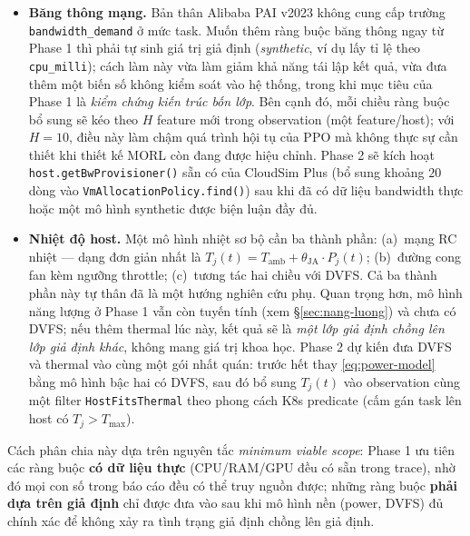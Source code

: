\begin{itemize}
  \item \textbf{Băng thông mạng.} Bản thân Alibaba PAI v2023 không cung
        cấp trường \texttt{bandwidth\_demand} ở mức task. Muốn thêm ràng
        buộc băng thông ngay từ Phase 1 thì phải tự sinh giá trị giả
        định (\textit{synthetic}, ví dụ lấy tỉ lệ theo
        \texttt{cpu\_milli}); cách làm này vừa làm giảm khả năng tái lập
        kết quả, vừa đưa thêm một biến số không kiểm soát vào hệ thống,
        trong khi mục tiêu của Phase 1 là \emph{kiểm chứng kiến trúc
        bốn lớp}. Bên cạnh đó, mỗi chiều ràng buộc bổ sung sẽ kéo theo
        $H$ feature mới trong observation (một feature/host); với $H =
        10$, điều này làm chậm quá trình hội tụ của PPO mà không thực
        sự cần thiết khi thiết kế MORL còn đang được hiệu chỉnh. Phase
        2 sẽ kích hoạt \texttt{host.getBwProvisioner()} sẵn có của
        CloudSim Plus (bổ sung khoảng $20$ dòng vào
        \texttt{VmAllocationPolicy.find()}) sau khi đã có dữ liệu
        bandwidth thực hoặc một mô hình synthetic được biện luận đầy đủ.
  \item \textbf{Nhiệt độ host.} Một mô hình nhiệt sơ bộ cần ba thành
        phần: (a)~mạng RC nhiệt --- dạng đơn giản nhất là
        $T_j(t) = T_{\mathrm{amb}} + \theta_{\mathrm{JA}} \cdot P_j(t)$;
        (b)~đường cong fan kèm ngưỡng throttle; (c)~tương tác hai chiều
        với DVFS. Cả ba thành phần này tự thân đã là một hướng nghiên
        cứu phụ. Quan trọng hơn, mô hình năng lượng ở Phase 1 vẫn còn
        tuyến tính (xem §\ref{sec:nang-luong}) và chưa có DVFS; nếu
        thêm thermal lúc này, kết quả sẽ là \emph{một lớp giả định
        chồng lên lớp giả định khác}, không mang giá trị khoa học.
        Phase 2 dự kiến đưa DVFS và thermal vào cùng một gói nhất quán:
        trước hết thay \eqref{eq:power-model} bằng mô hình bậc hai có
        DVFS, sau đó bổ sung $T_j(t)$ vào observation cùng một filter
        \texttt{HostFitsThermal} theo phong cách K8s predicate (cấm gán
        task lên host có $T_j > T_{\max}$).
\end{itemize}

Cách phân chia này dựa trên nguyên tắc \emph{minimum viable scope}: Phase
1 ưu tiên các ràng buộc \textbf{có dữ liệu thực} (CPU/RAM/GPU đều có sẵn
trong trace), nhờ đó mọi con số trong báo cáo đều có thể truy nguồn được;
những ràng buộc \textbf{phải dựa trên giả định} chỉ được đưa vào sau khi
mô hình nền (power, DVFS) đủ chính xác để không xảy ra tình trạng giả
định chồng lên giả định.

